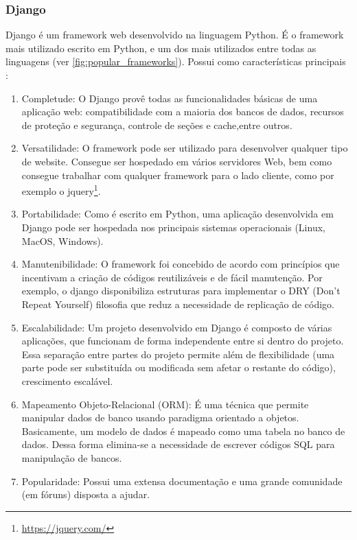 	\subsubsection{Django}
		Django é um framework web desenvolvido na linguagem Python. É o framework mais utilizado escrito em Python, e um dos mais utilizados entre todas as linguagens (ver \autoref{fig:popular_frameworks}). Possui como características principais \cite{mozzila}: 
		\begin{enumerate}
			\item 
			Completude: O Django provê todas as funcionalidades básicas de uma aplicação web: compatibilidade com a maioria dos bancos de dados,
			recursos de proteção e segurança, controle de seções e cache,entre outros.
			\item 
			Versatilidade: O framework pode ser utilizado para desenvolver qualquer tipo de website. Consegue ser hospedado em vários servidores Web, bem como consegue trabalhar com qualquer framework para o lado cliente, como por exemplo o jquery\footnote{\url{https://jquery.com/}}.
			\item 
			Portabilidade: Como é escrito em Python, uma aplicação desenvolvida em Django pode ser hospedada nos principais sistemas operacionais (Linux, MacOS, Windows). 
			\item 
			Manutenibilidade: O framework foi concebido de acordo com princípios que incentivam a criação de códigos reutilizáveis e de fácil manutenção. Por exemplo, o django disponibiliza estruturas para implementar o DRY (Don't Repeat Yourself) filosofia que reduz a necessidade de replicação de código.
			\item 
			Escalabilidade: Um projeto desenvolvido em Django é composto de várias aplicações, que funcionam de forma independente entre si dentro do projeto. Essa separação entre partes do projeto permite além de flexibilidade (uma parte pode ser substituída ou modificada sem afetar o restante do código), crescimento escalável.
			\item
			Mapeamento Objeto-Relacional (ORM): É uma técnica que permite manipular dados de banco usando paradigma orientado a objetos. Basicamente, um modelo de dados é mapeado como uma tabela no banco de dados. Dessa forma elimina-se a necessidade de escrever códigos SQL para manipulação de bancos.
			\item 
			Popularidade: Possui uma extensa documentação e uma grande comunidade (em fóruns) disposta a ajudar.
		\end{enumerate}
	
